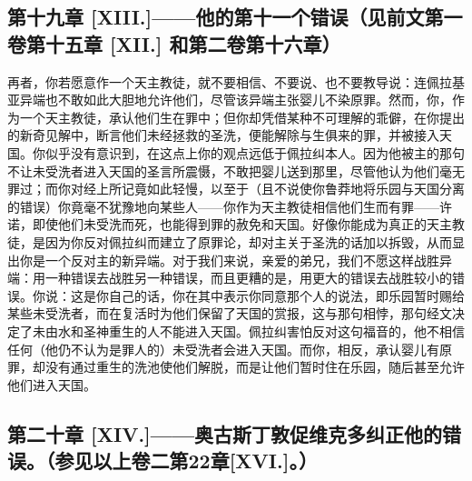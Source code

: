 
\subsection{第十九章 [XIII.]——他的第十一个错误（见前文第一卷第十五章 [XII.] 和第二卷第十六章）}

再者，你若愿意作一个天主教徒，就不要相信、不要说、也不要教导说：连佩拉基亚异端也不敢如此大胆地允许他们，尽管该异端主张婴儿不染原罪。然而，你，作为一个天主教徒，承认他们生在罪中；但你却凭借某种不可理解的乖僻，在你提出的新奇见解中，断言他们未经拯救的圣洗，便能解除与生俱来的罪，并被接入天国。你似乎没有意识到，在这点上你的观点远低于佩拉纠本人。因为他被主的那句不让未受洗者进入天国的圣言所震慑，不敢把婴儿送到那里，尽管他认为他们毫无罪过；而你对经上所记竟如此轻慢，以至于（且不说使你鲁莽地将乐园与天国分离的错误）你竟毫不犹豫地向某些人——你作为天主教徒相信他们生而有罪——许诺，即使他们未受洗而死，也能得到罪的赦免和天国。好像你能成为真正的天主教徒，是因为你反对佩拉纠而建立了原罪论，却对主关于圣洗的话加以拆毁，从而显出你是一个反对主的新异端。对于我们来说，亲爱的弟兄，我们不愿这样战胜异端：用一种错误去战胜另一种错误，而且更糟的是，用更大的错误去战胜较小的错误。你说：这是你自己的话，你在其中表示你同意那个人的说法，即乐园暂时赐给某些未受洗者，而在复活时为他们保留了天国的赏报，这与那句相悖，那句经文决定了未由水和圣神重生的人不能进入天国。佩拉纠害怕反对这句福音的，他不相信任何（他仍不认为是罪人的）未受洗者会进入天国。而你，相反，承认婴儿有原罪，却没有通过重生的洗池使他们解脱，而是让他们暂时住在乐园，随后甚至允许他们进入天国。\par


\subsection{第二十章 [XIV.]——奥古斯丁敦促维克多纠正他的错误。（参见以上卷二第22章[XVI.]。）}

